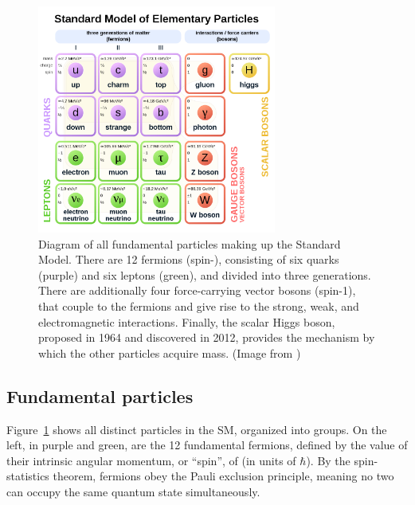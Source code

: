 \begin{figure}[ht]
  \begin{center}
    \includegraphics[width=0.70\textwidth]{figs/theory/standard_model.png}
    \caption{Diagram of all fundamental particles making up the Standard Model. There are 12 fermions (spin-), 
      consisting of six quarks (purple) and six leptons (green), 
      and divided into three generations. There are additionally four force-carrying vector bosons (spin-1),
      that couple to the fermions and give rise to the strong, weak, and electromagnetic interactions.
      Finally, the scalar Higgs boson, proposed in 1964 and discovered in 2012, provides the mechanism
      by which the other particles acquire mass. (Image from \cite{SM_diagram})
            }
    \label{fig:sm}
  \end{center}
\end{figure}

\subsection{Fundamental particles}

Figure~\ref{fig:sm} shows all distinct particles in the SM, organized into groups.
On the left, in purple and green, are the 12 fundamental fermions, defined by the
value of their intrinsic angular momentum, or ``spin'', of  (in units
of $\hbar$). By the spin-statistics theorem, fermions obey the Pauli exclusion principle,
meaning no two can occupy the same quantum state simultaneously.


